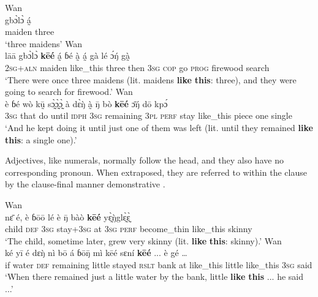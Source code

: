 \documentclass[output=paper,colorlinks,citecolor=brown]{langscibook}
\begin{document}
\ea\label{ex:nikitina:18}
\ea\label{ex:nikitina:18a} {Wan}\\
\gll gb\`{ɔ}l\`{ɔ} á̰\\
     maiden three\\
\glt ‘three maidens’
\ex\label{ex:nikitina:18b} {Wan}\\
\gll lāā gb\`{ɔ}l\`{ɔ} \textbf{kēé} á̰ ɓé à̰ á̰ gà lé \'{ɔ}\'{ŋ} gà̰\\
     \textsc{2sg+aln} maiden like\_this three then \textsc{3sg} \textsc{cop} go \textsc{prog} firewood search\\
\glt ‘There were once three maidens (lit. maidens \textbf{like} \textbf{this}: three), and they were going to search for firewood.’
\ex\label{ex:nikitina:18c} {Wan}\\
\gll è ɓé wò kṵ̄ s\`{ɔ̰}\`{ɔ̰}\`{ɔ̰} à d\`{ɛ}\`{ŋ} à̰ \={ŋ} bò \textbf{kēé} \={ɔ}\'{ŋ} dō kp\'{ɔ}\\
     \textsc{3sg} that do until \textsc{idph} \textsc{3sg} remaining \textsc{3pl} \textsc{perf} stay like\_this piece one single\\
\glt ‘And he kept doing it until just one of them was left (lit. until they remained \textbf{like} \textbf{this}: a single one).’
\z
\z

Adjectives, like numerals, normally follow the head, and they also have no corresponding pronoun. When extraposed, they are referred to within the clause by the clause-final manner demonstrative .


\ea\label{ex:nikitina:19}
\ea\label{ex:nikitina:19a} {Wan}\\
\gll n\={ɛ} é, è ɓōō lé è \={ŋ} bàò \textbf{kēé} y\`{ɛ̰}\`{ŋ}gl\`{ɛ̰}\`{ɛ̰}\\
     child \textsc{def} \textsc{3sg} stay+\textsc{3sg} at \textsc{3sg} \textsc{perf} become\_thin like\_this skinny\\
\glt ‘The child, sometime later, grew very skinny (lit. \textbf{like} \textbf{this}: skinny).’
\ex\label{ex:nikitina:19b} {Wan}\\
\gll ké yī é dɛ\`{ŋ} nì bō á ɓō\={ŋ} mì kēé sɛní \textbf{kēé} ... è gé …\\
     if water \textsc{def} remaining little stayed \textsc{rslt} bank at like\_this little like\_this {} \textsc{3sg} said\\
\glt ‘When there remained just a little water by the bank, little \textbf{like} \textbf{this} ... he said ...’
\z
\z
\end{document}
